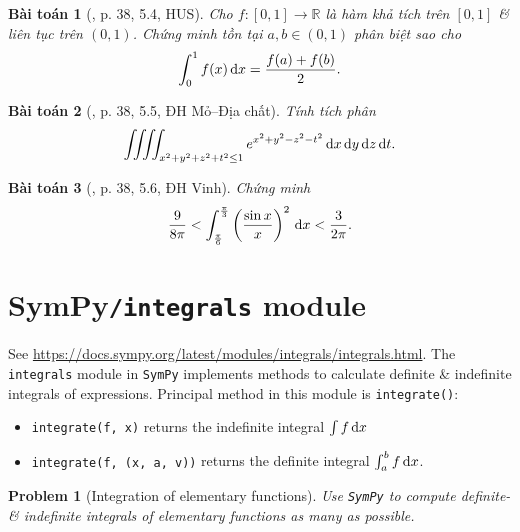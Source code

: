 \documentclass[oneside]{book}
\newtheorem{baitoan}{Bài toán}
\newtheorem{problem}{Problem}
\begin{document}
\begin{baitoan}[\cite{VMS_VMC2024}, p. 38, 5.4, HUS]
	Cho $f:[0,1]\to\mathbb{R}$ là hàm khả tích trên $[0,1]$ \& liên tục trên $(0,1)$. Chứng minh tồn tại $a,b\in(0,1)$ phân biệt sao cho
	\begin{equation*}
		\int_0^1 f(x)\,{\rm d}x = \frac{f(a) + f(b)}{2}.
	\end{equation*}
\end{baitoan}

\begin{baitoan}[\cite{VMS_VMC2024}, p. 38, 5.5, ĐH Mỏ--Địa chất]
	Tính tích phân
	\begin{equation*}
		\iiiint_{x^2 + y^2 + z^2 + t^2\le1} e^{x^2 + y^2 - z^2 - t^2}\,{\rm d}x\,{\rm d}y\,{\rm d}z\,{\rm d}t.
	\end{equation*}
\end{baitoan}

\begin{baitoan}[\cite{VMS_VMC2024}, p. 38, 5.6, ĐH Vinh]
	Chứng minh
	\begin{equation*}
		\frac{9}{8\pi} < \int_{\frac{\pi}{6}}^{\frac{\pi}{3}} \left(\frac{\sin x}{x}\right)^2\,{\rm d}x < \frac{3}{2\pi}.
	\end{equation*}
\end{baitoan}


\section{SymPy{\tt/integrals} module}
See \url{https://docs.sympy.org/latest/modules/integrals/integrals.html}. The {\tt integrals} module in {\tt SymPy} implements methods to calculate definite \& indefinite integrals of expressions. Principal method in this module is {\tt integrate()}:
\begin{itemize}
	\item {\tt integrate(f, x)} returns the indefinite integral $\int f\,{\rm d}x$
	\item {\tt integrate(f, (x, a, v))} returns the definite integral $\int_a^b f\,{\rm d}x$.
\end{itemize}

\begin{problem}[Integration of elementary functions]
	Use {\tt SymPy} to compute definite- \& indefinite integrals of elementary functions as many as possible.
\end{problem}
\end{document}
